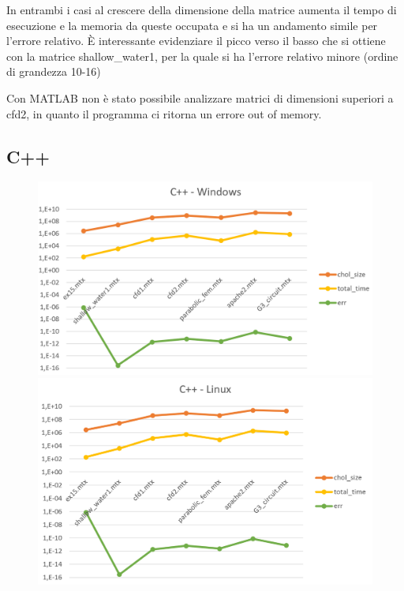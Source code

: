 \documentclass[a4paper,10pt]{article}
\begin{document}
In entrambi i casi al crescere della dimensione della matrice aumenta il tempo di esecuzione e la memoria da queste occupata e si ha un andamento simile per l’errore relativo. È interessante evidenziare il picco verso il basso che si ottiene con la matrice shallow\_water1, per la quale si ha l’errore relativo minore (ordine di grandezza 10-16)

Con MATLAB non è stato possibile analizzare matrici di dimensioni superiori a cfd2, in quanto il programma ci ritorna un errore out of memory. 

\subsection{C++}

\begin{figure}[H]
\centering
\begin{minipage}{.5\textwidth}
  \centering
  \includegraphics[width=1\linewidth]{img/c++win.png}
\end{minipage}%
\begin{minipage}{.5\textwidth}
  \centering
  \includegraphics[width=1\linewidth]{img/c++linux.png}
\end{minipage}
\end{figure}
\end{document}
